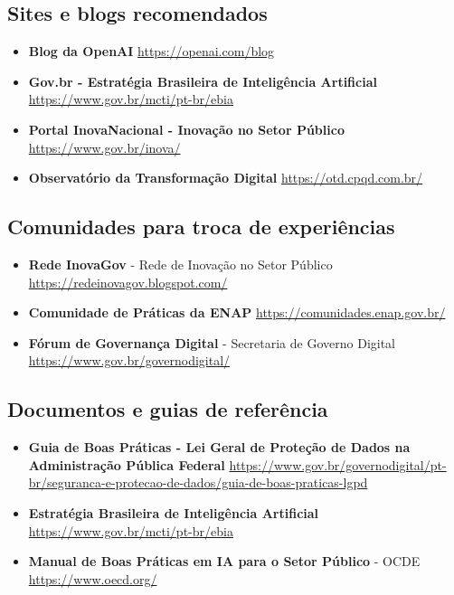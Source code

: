 \documentclass[12pt,a4paper]{book}
\begin{document}
\subsection{Sites e blogs recomendados}

\begin{itemize}
    \item \textbf{Blog da OpenAI}
    \url{https://openai.com/blog}
    
    \item \textbf{Gov.br - Estratégia Brasileira de Inteligência Artificial}
    \url{https://www.gov.br/mcti/pt-br/ebia}
    
    \item \textbf{Portal InovaNacional - Inovação no Setor Público}
    \url{https://www.gov.br/inova/}
    
    \item \textbf{Observatório da Transformação Digital}
    \url{https://otd.cpqd.com.br/}
\end{itemize}

\subsection{Comunidades para troca de experiências}

\begin{itemize}
    \item \textbf{Rede InovaGov} - Rede de Inovação no Setor Público
    \url{https://redeinovagov.blogspot.com/}
    
    \item \textbf{Comunidade de Práticas da ENAP}
    \url{https://comunidades.enap.gov.br/}
    
    \item \textbf{Fórum de Governança Digital} - Secretaria de Governo Digital
    \url{https://www.gov.br/governodigital/}
\end{itemize}

\subsection{Documentos e guias de referência}

\begin{itemize}
    \item \textbf{Guia de Boas Práticas - Lei Geral de Proteção de Dados na Administração Pública Federal}
    \url{https://www.gov.br/governodigital/pt-br/seguranca-e-protecao-de-dados/guia-de-boas-praticas-lgpd}
    
    \item \textbf{Estratégia Brasileira de Inteligência Artificial}
    \url{https://www.gov.br/mcti/pt-br/ebia}
    
    \item \textbf{Manual de Boas Práticas em IA para o Setor Público} - OCDE
    \url{https://www.oecd.org/}
\end{itemize}
\end{document}
